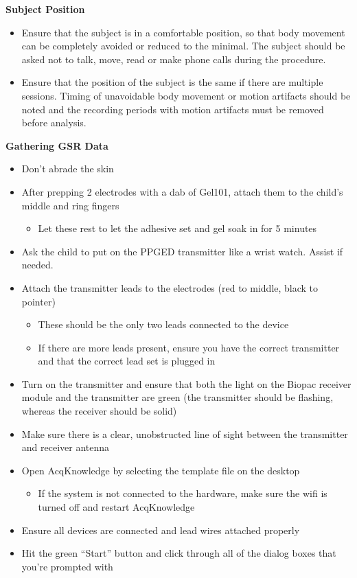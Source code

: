 \documentclass[]{book}
\providecommand{\tightlist}{%
  \setlength{\itemsep}{0pt}\setlength{\parskip}{0pt}}
\begin{document}
\textbf{Subject Position}

\begin{itemize}
\tightlist
\item
  Ensure that the subject is in a comfortable position, so that body movement can be completely avoided or reduced to the minimal. The subject should be asked not to talk, move, read or make phone calls during the procedure.
\item
  Ensure that the position of the subject is the same if there are multiple sessions. Timing of unavoidable body movement or motion artifacts should be noted and the recording periods with motion artifacts must be removed before analysis.
\end{itemize}

\textbf{Gathering GSR Data}

\begin{itemize}
\tightlist
\item
  Don't abrade the skin
\item
  After prepping 2 electrodes with a dab of Gel101, attach them to the child's middle and ring fingers

  \begin{itemize}
  \tightlist
  \item
    Let these rest to let the adhesive set and gel soak in for 5 minutes
  \end{itemize}
\item
  Ask the child to put on the PPGED transmitter like a wrist watch. Assist if needed.
\item
  Attach the transmitter leads to the electrodes (red to middle, black to pointer)

  \begin{itemize}
  \tightlist
  \item
    These should be the only two leads connected to the device
  \item
    If there are more leads present, ensure you have the correct transmitter and that the correct lead set is plugged in
  \end{itemize}
\item
  Turn on the transmitter and ensure that both the light on the Biopac receiver module and the transmitter are green (the transmitter should be flashing, whereas the receiver should be solid)
\item
  Make sure there is a clear, unobstructed line of sight between the transmitter and receiver antenna
\item
  Open AcqKnowledge by selecting the template file on the desktop

  \begin{itemize}
  \tightlist
  \item
    If the system is not connected to the hardware, make sure the wifi is turned off and restart AcqKnowledge
  \end{itemize}
\item
  Ensure all devices are connected and lead wires attached properly
\item
  Hit the green ``Start'' button and click through all of the dialog boxes that you're prompted with
\end{itemize}
\end{document}
